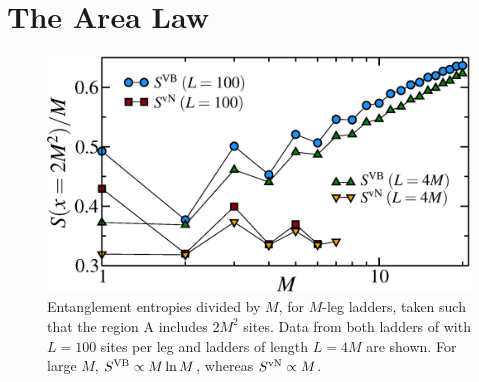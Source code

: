  
\section{The Area Law}

\begin{figure} { \includegraphics[width=6in]{./figures/paper1/figure4/4fig.eps}
 \caption[Area Law in 2D Heis model]{
Entanglement entropies divided by $M$,  for $M$-leg ladders, taken such that
the region A includes $2M^2$ sites.  
Data from both ladders of  with $L=100$ sites per leg and ladders of length $L=4M$ 
 are shown.
For large $M$, $S^{\rm VB}\propto M \ln M$,
whereas $S^{\rm vN}\propto M$.   
\label{zigzag}}} 
\end{figure}

